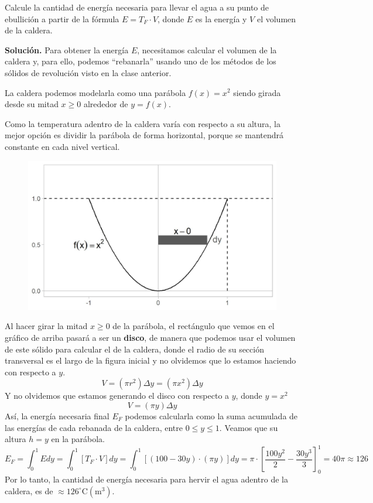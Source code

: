 \documentclass[12pt]{article}
\begin{document}
Calcule la cantidad de energía necesaria para llevar el agua a su punto de ebullición a partir de la fórmula $E = T_{F} \cdot V$, donde $E$ es la energía y $V$ el volumen de la caldera.

\textbf{Solución.} Para obtener la energía $E$, necesitamos calcular el volumen de la caldera y, para ello, podemos ``rebanarla'' usando uno de los métodos de los sólidos de revolución visto en la clase anterior.

La caldera podemos modelarla como una parábola $f(x) = x^{2}$ siendo girada desde su mitad $x \geq 0$ alrededor de $y = f(x)$.

Como la temperatura adentro de la caldera varía con respecto a su altura, la mejor opción es dividir la parábola de forma horizontal, porque se mantendrá constante en cada nivel vertical.


\begin{figure}[hbt!]
\centering
\includegraphics[scale=0.55]{img/cauldron-heat-2.jpg}
\end{figure}

Al hacer girar la mitad $x \geq 0$ de la parábola, el rectángulo que vemos en el gráfico de arriba pasará a ser un \textbf{disco}, de manera que podemos usar el volumen de este sólido para calcular el de la caldera, donde el radio de su sección transversal es el largo de la figura inicial y no olvidemos que lo estamos haciendo con respecto a $y$.
\[
  V = (\pi r^{2}) \Delta y = (\pi x^{2}) \Delta y
\]
Y no olvidemos que estamos generando el disco con respecto a $y$, donde $y = x^{2}$
\[
  V = (\pi y) \Delta y
\]
Así, la energía necesaria final $E_{F}$ podemos calcularla como la suma acumulada de las energías de cada rebanada de la caldera, entre $0 \leq y \leq 1$. Veamos que su altura $h = y$ en la parábola.
\[
  E_{F} = \int_{0}^{1} Edy
        = \int_{0}^{1} [T_{F} \cdot V]dy
        = \int_{0}^{1} [(100 - 30y) \cdot (\pi y)]dy
        = \pi \cdot \left[\frac{100y^{2}}{2} - \frac{30y^{3}}{3}\right]_{0}^{1}
        = 40 \pi
        \approx 126
\]
Por lo tanto, la cantidad de energía necesaria para hervir el agua adentro de la caldera, es de $\approx 126^{\circ} \text{C} (\text{m}^{3})$.
\end{document}
